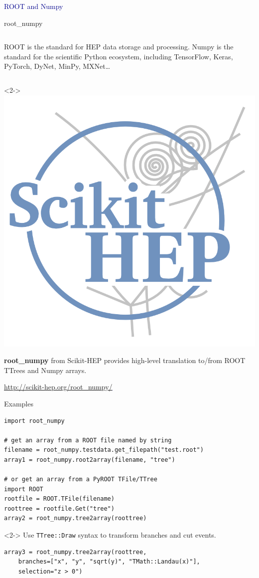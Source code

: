 \documentclass{beamer}
\begin{document}
\begin{frame}{}
\begin{center}
\LARGE \textcolor{darkblue}{ROOT and Numpy}
\end{center}
\end{frame}

\begin{frame}[frame]{root\_numpy}
\vfill
\begin{columns}[t]
ROOT is the standard for HEP data storage and processing.
Numpy is the standard for the scientific Python ecosystem, including TensorFlow, Keras, {\small PyTorch,} {\footnotesize DyNet,} {\scriptsize MinPy,} {\tiny MXNet\ldots}
\end{columns}

\vfill
\begin{uncoverenv}<2->
\includegraphics[height=2.5 cm]{scikit-hep_logo_800.png}

\vspace{-2.5 cm}
\hfill \begin{minipage}{0.7\linewidth}
{\bf root\_numpy} from Scikit-HEP provides high-level translation to/from ROOT TTrees and Numpy arrays.

\vspace{0.5 cm}
\textcolor{blue}{\underline{\url{http://scikit-hep.org/root_numpy/}}}
\end{minipage}
\end{uncoverenv}
\end{frame}

\begin{frame}[fragile]{Examples}
\small
\begin{verbatim}
import root_numpy

# get an array from a ROOT file named by string
filename = root_numpy.testdata.get_filepath("test.root")
array1 = root_numpy.root2array(filename, "tree")

# or get an array from a PyROOT TFile/TTree
import ROOT
rootfile = ROOT.TFile(filename)
roottree = rootfile.Get("tree")
array2 = root_numpy.tree2array(roottree)
\end{verbatim}

\vspace{0.5 cm}
\begin{uncoverenv}<2->
{\normalsize Use {\tt TTree::Draw} syntax to transform branches and cut events.}

\begin{verbatim}
array3 = root_numpy.tree2array(roottree,
    branches=["x", "y", "sqrt(y)", "TMath::Landau(x)"],
    selection="z > 0")
\end{verbatim}
\end{uncoverenv}
\end{frame}
\end{document}

